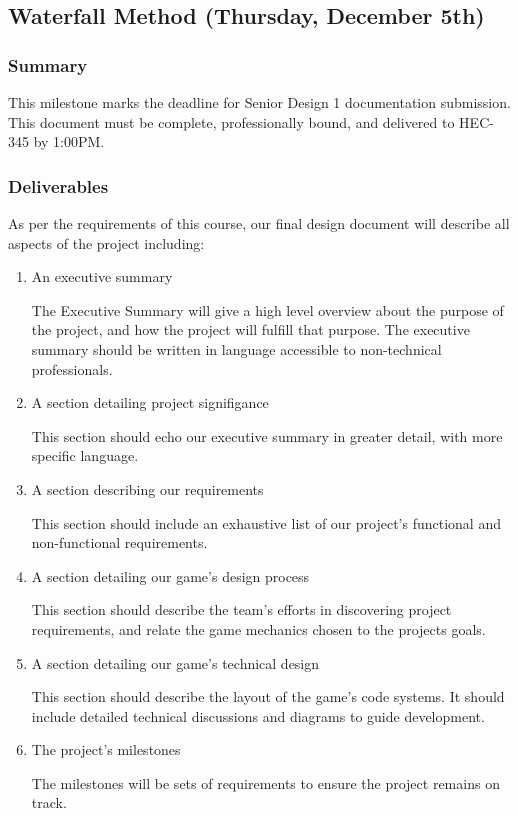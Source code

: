 \subsection{Waterfall Method (Thursday, December 5th)}

\subsubsection*{Summary}
This milestone marks the deadline for Senior Design 1 documentation submission. This document must be complete, professionally bound, and delivered to HEC-345 by 1:00PM.

\subsubsection*{Deliverables}
As per the requirements of this course, our final design document will describe
all aspects of the project including:
\begin{enumerate}
  \item An executive summary
  
  The Executive Summary will give a high level overview about the purpose of the project, and how the project will fulfill that purpose. The executive summary should be written in language accessible to non-technical professionals.

  \item A section detailing project signifigance
  
  This section should echo our executive summary in greater detail, with more specific language.

  \item A section describing our requirements
  
  This section should include an exhaustive list of our project's functional and non-functional requirements.

  \item A section detailing our game's design process
  
  This section should describe the team's efforts in discovering project requirements, and relate the game mechanics chosen to the projects goals.

  \item A section detailing our game's technical design
  
  This section should describe the layout of the game's code systems. It should include detailed technical discussions and diagrams to guide development.

  \item The project's milestones
  
  The milestones will be sets of requirements to ensure the project remains on track.

\end{enumerate}


